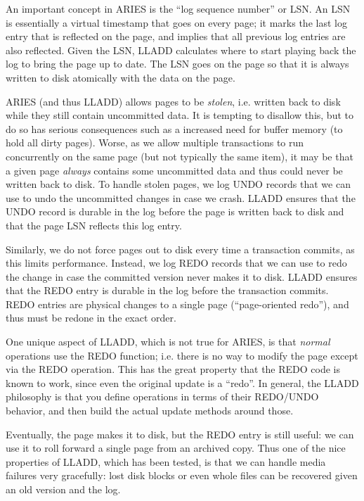 \documentclass[letterpaper,english]{article}
\begin{document}
\begin{enumerate}
\begin{enumerate}
\begin{enumerate}
An important concept in ARIES is the ``log sequence number'' or LSN.
An LSN is essentially a virtual timestamp that goes on every page; it
marks  the last log entry that is reflected on the page, and
implies that all previous log entries are also reflected. Given the
LSN, LLADD calculates where to start playing back the log to bring the page
up to date.  The LSN goes on the page so that it is always written to
disk atomically with the data on the page.

ARIES (and thus LLADD) allows pages to be {\em stolen}, i.e. written
back to disk while they still contain uncommitted data.  It is
tempting to disallow this, but to do so has serious consequences such as
a increased need for buffer memory (to hold all dirty pages). Worse,
as we allow multiple transactions to run concurrently on the same page
(but not typically the same item), it may be that a given page {\em
always} contains some uncommitted data and thus could never be written
back to disk.  To handle stolen pages, we log UNDO records that
we can use to undo the uncommitted changes in case we crash.  LLADD
ensures that the UNDO record is durable in the log before the
page is written back to disk and that the page LSN reflects this log entry.

Similarly, we do not force pages out to disk every time a transaction
commits, as this limits performance.  Instead, we log REDO records
that we can use to redo the change in case the committed version never
makes it to disk.  LLADD ensures that the REDO entry is durable in the
log before the transaction commits.  REDO entries are physical changes
to a single page (``page-oriented redo''), and thus must be redone in
the exact order.

One unique aspect of LLADD, which
is not true for ARIES, is that {\em normal} operations use the REDO
function; i.e. there is no way to modify the page except via the REDO
operation.  This has the great property that the REDO code is known to
work, since even the original update is a ``redo''.
In general, the LLADD philosophy is that you
define operations in terms of their REDO/UNDO behavior, and then build
the actual update methods around those.

Eventually, the page makes it to disk, but the REDO entry is still
useful: we can use it to roll forward a single page from an archived
copy.  Thus one of the nice properties of LLADD, which has been
tested, is that we can handle media failures very gracefully: lost
disk blocks or even whole files can be recovered given an old version
and the log.  


\end{enumerate}
\end{enumerate}
\end{enumerate}
\end{document}
